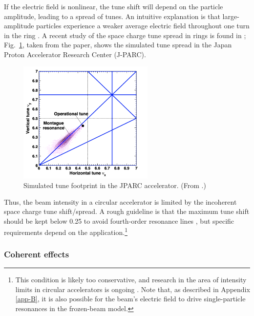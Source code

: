If the electric field is nonlinear, the tune shift will depend on the particle amplitude, leading to a spread of tunes. An intuitive explanation is that large-amplitude particles experience a weaker average electric field throughout one turn in the ring \cite{Franchetti2017}. A recent study of the space charge tune spread in rings is found in \cite{Hotchi2020}; Fig.~\ref{fig:jparc_montague}, taken from the paper, shows the simulated tune spread in the Japan Proton Accelerator Research Center (J-PARC).
%
\begin{figure}[!p]
    \centering
    \includegraphics[width=0.6\textwidth]{Images/chapter1/montague.png}
    \caption{Simulated tune footprint in the JPARC accelerator. (From \cite{Hotchi2020}.)}
    \label{fig:jparc_montague}
\end{figure}
%
Thus, the beam intensity in a circular accelerator is limited by the incoherent space charge tune shift/spread. A rough guideline is that the maximum tune shift should be kept below 0.25 to avoid fourth-order resonance lines \cite{book:Reiser}, but specific requirements depend on the application.\footnote{This condition is likely too conservative, and research in the area of intensity limits in circular accelerators is ongoing \cite{Cousineau2003, Hofmann2017Book, Kojima2019, Kojima2022}. Note that, as described in Appendix \ref{app-B}, it is also possible for the beam's electric field to drive single-particle resonances in the frozen-beam model.}



\subsubsection{Coherent effects}

